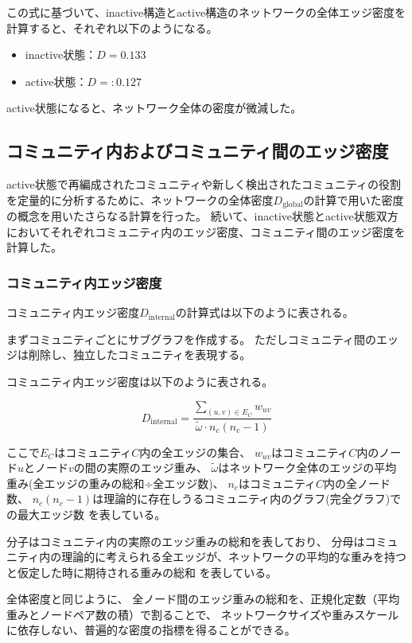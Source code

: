 この式に基づいて、inactive構造とactive構造のネットワークの全体エッジ密度を計算すると、それぞれ以下のようになる。
\begin{itemize}
    \item inactive状態：\( D = 0.133 \)
    \item active状態：\( D = :0.127 \)
\end{itemize}

active状態になると、ネットワーク全体の密度が微減した。

\subsection{コミュニティ内およびコミュニティ間のエッジ密度}
active状態で再編成されたコミュニティや新しく検出されたコミュニティの役割を定量的に分析するために、ネットワークの全体密度$D_{\text{global}}$の計算で用いた密度の概念を用いたさらなる計算を行った。
続いて、inactive状態とactive状態双方においてそれぞれコミュニティ内のエッジ密度、コミュニティ間のエッジ密度を計算した。

\subsubsection{コミュニティ内エッジ密度}
コミュニティ内エッジ密度$D_{\text{internal}}$の計算式は以下のように表される。

まずコミュニティごとにサブグラフを作成する。
ただしコミュニティ間のエッジは削除し、独立したコミュニティを表現する。

コミュニティ内エッジ密度は以下のように表される。

\begin{equation}
  D_{\text{internal}} = \frac{\sum_{(u,v) \in E_C} w_{uv}}{\tilde{\omega} \cdot n_c (n_c - 1)}
  \label{eq:internal_density}
  \end{equation}

ここで$E_C$はコミュニティ$C$内の全エッジの集合、
$w_{uv}$はコミュニティ$C$内のノード$u$とノード$v$の間の実際のエッジ重み、
$\tilde{\omega}$はネットワーク全体のエッジの平均重み(全エッジの重みの総和÷全エッジ数)、
$n_c$はコミュニティ$C$内の全ノード数、
$n_c (n_c - 1)$は理論的に存在しうるコミュニティ内のグラフ(完全グラフ)での最大エッジ数
を表している。

分子はコミュニティ内の実際のエッジ重みの総和を表しており、
分母はコミュニティ内の理論的に考えられる全エッジが、ネットワークの平均的な重みを持つと仮定した時に期待される重みの総和
を表している。

全体密度と同じように、
全ノード間のエッジ重みの総和を、正規化定数（平均重みとノードペア数の積）で割ることで、
ネットワークサイズや重みスケールに依存しない、普遍的な密度の指標を得ることができる。

